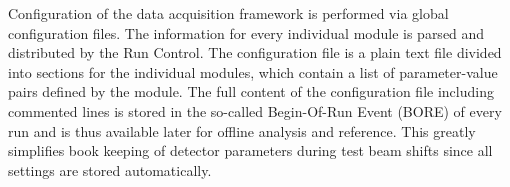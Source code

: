 Configuration of the data acquisition framework is performed via global configuration files. 
The information for every individual module is parsed and distributed by the Run Control. 
The configuration file is a plain text file divided into sections for the individual modules, which contain a list of parameter-value pairs defined by the module.
The full content of the configuration file including commented lines is stored in the so-called Begin-Of-Run Event (BORE) of every run and is thus available later for offline analysis and reference. 
This greatly simplifies book keeping of detector parameters during test beam shifts since all settings are stored automatically.
